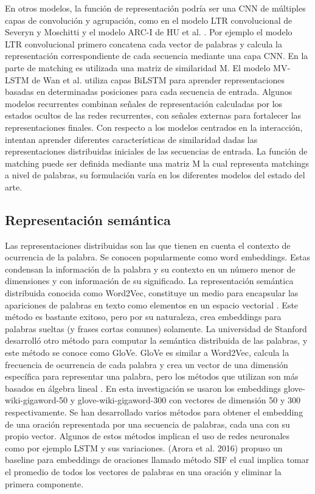 \documentclass{llncs}
\begin{document}
En otros modelos, la función de representación podría ser una CNN de múltiples capas de convolución y agrupación, como en el modelo LTR convolucional de Severyn y Moschitti \cite{238} y el modelo ARC-I de HU et al. \cite{17}. Por ejemplo el modelo LTR convolucional \cite{238} primero concatena cada vector de palabras y calcula la representación correspondiente de cada secuencia mediante una capa CNN. En la parte de matching es utilizada una matriz de similaridad M.
El modelo MV-LSTM de Wan et al. \cite{3} utiliza capas BiLSTM para aprender representaciones basadas en determinadas posiciones para cada secuencia de entrada. Algunos modelos recurrentes \cite{243,241} combinan señales de representación calculadas por los estados ocultos de las redes recurrentes, con señales externas para fortalecer las representaciones finales.
Con respecto a los modelos centrados en la interacción, intentan aprender diferentes características de similaridad dadas las representaciones distribuidas iniciales de las secuencias de entrada. La función de matching puede ser definida mediante una matriz M la cual representa matchings a nivel de palabras, su formulación varía en los diferentes modelos del estado del arte. 

\subsection{Representación semántica}

Las representaciones distribuidas son las que tienen en cuenta el contexto de ocurrencia de la palabra. Se conocen popularmente como word embeddings. Estas condensan la información de la palabra y su contexto en un número menor de dimensiones y con información de su significado.
La representación semántica distribuida conocida como Word2Vec, constituye un medio para encapsular las apariciones de palabras en texto como elementos en un espacio vectorial \cite{2}. Este método es bastante exitoso, pero por su naturaleza, crea embeddings para palabras sueltas (y frases cortas comunes) solamente. La universidad de Stanford desarrolló otro método para computar la semántica distribuida de las palabras, y este método se conoce como GloVe. GloVe es similar a Word2Vec, calcula la frecuencia de ocurrencia de cada palabra y crea un vector de una dimensión específica para representar una palabra, pero los métodos que utilizan son más basados en álgebra lineal \cite{0}. En esta investigación se usaron los embeddings glove-wiki-gigaword-50 y glove-wiki-gigaword-300 con vectores de dimensión 50 y 300 respectivamente.
Se han desarrollado varios métodos para obtener el embedding de una oración representada por una secuencia de palabras, cada una con su propio vector. Algunos de estos métodos implican el uso de redes neuronales como por ejemplo LSTM y sus variaciones. (Arora et al. 2016) \cite{1} propuso un baseline para embeddings de oraciones llamado método SIF el cual implica tomar el promedio de todos los vectores de palabras en una oración y eliminar la primera componente. 
\end{document}
